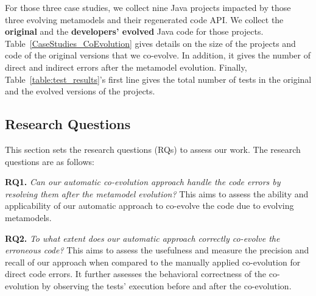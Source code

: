 	
	For those three case studies, we collect nine Java projects impacted by those three evolving metamodels and their regenerated code API. We collect the \textbf{original} and the \textbf{developers' evolved} Java code for those projects.
	Table~\ref{CaseStudies_CoEvolution} gives details on the size of the projects and code of the original versions that we co-evolve.  In addition, it gives the number of direct and indirect errors after the metamodel evolution. Finally, Table~\ref{table:test_results}'s first line gives the total number of tests in the original and the evolved versions of the projects.
	
	
	
	\subsection{Research Questions}
	This section sets the research questions (RQs) to assess our work. The research questions are as follows:
	
	
	
	\blue{}
	\textbf{RQ1.}  \emph{Can our automatic co-evolution approach handle the code errors by resolving them after the metamodel evolution?} This aims to assess the ability and applicability of our automatic approach to co-evolve the code due to evolving metamodels.  %
	
	
	\textbf{RQ2.} \emph{To what extent does our automatic approach correctly co-evolve the erroneous code?} This aims to assess the usefulness and measure the precision and recall of our approach when compared to the manually applied co-evolution for direct code errors. It further assesses the behavioral correctness of the co-evolution by observing the tests' execution before and after the co-evolution. %
	
